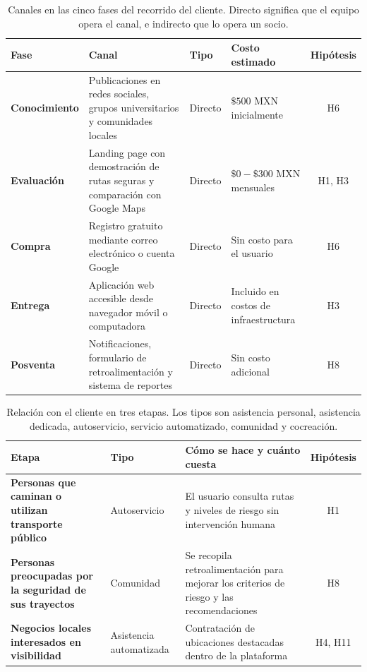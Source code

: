 \documentclass[11pt]{article}
\begin{document}
\begin{table}[H]
	\caption{Canales en las cinco fases del recorrido del cliente. Directo significa que el
		equipo opera el canal, e indirecto que lo opera un socio.}
	\label{tab:canales}
	\small
	\renewcommand{\arraystretch}{1.2}
	\begin{tabularx}{\textwidth}{@{}>{\bfseries}p{}Xp{}p{}c@{}}
		\toprule
		Fase & Canal & Tipo & Costo estimado & Hipótesis \\
		\midrule
		Conocimiento & Publicaciones en redes sociales, grupos universitarios y comunidades locales & Directo& $\$500$ MXN inicialmente& H6\\
		Evaluación & Landing page con demostración de rutas seguras y comparación con Google Maps & Directo & $\$ 0 - \$300$ MXN mensuales & H1, H3  \\
		Compra & Registro gratuito mediante correo electrónico o cuenta Google  & Directo &  Sin costo para el usuario& H6 \\
		Entrega & Aplicación web accesible desde navegador móvil o computadora & Directo & Incluido en costos de infraestructura & H3 \\
		Posventa & Notificaciones, formulario de retroalimentación y sistema de reportes & Directo & Sin costo adicional& H8 \\
		\bottomrule
	\end{tabularx}
\end{table}

\begin{table}[H]
	\caption{Relación con el cliente en tres etapas. Los tipos son asistencia personal,
		asistencia dedicada, autoservicio, servicio automatizado, comunidad y cocreación.}
	\label{tab:relacion}
	\small
	\renewcommand{\arraystretch}{1.2}
	\begin{tabularx}{\textwidth}{@{}>{\bfseries}p{}p{}Xc@{}}
		\toprule
		Etapa & Tipo & Cómo se hace y cuánto cuesta & Hipótesis \\
		\midrule
		Personas que caminan o utilizan transporte público & Autoservicio & El usuario consulta rutas y niveles de riesgo sin intervención humana& H1 \\
		Personas preocupadas por la seguridad de sus trayectos &Comunidad &Se recopila retroalimentación para mejorar los criterios de riesgo y las recomendaciones  & H8 \\
		Negocios locales interesados en visibilidad & Asistencia automatizada & Contratación de ubicaciones destacadas dentro de la plataforma & H4, H11\\
		\bottomrule
	\end{tabularx}
\end{table}
\end{document}
